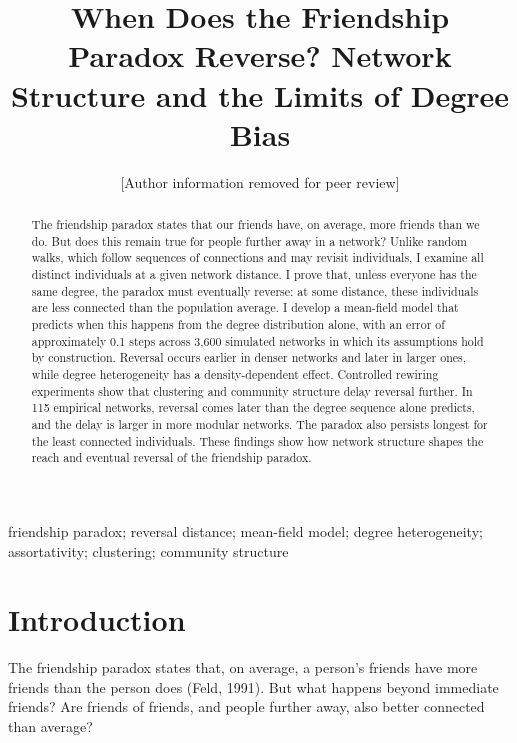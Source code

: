 \documentclass{nws}
\begin{document}


\title{When Does the Friendship Paradox Reverse? Network Structure and the Limits of Degree Bias}

\author{[Author information removed for peer review]}

\affil{}

\begin{abstract}
The friendship paradox states that our friends have, on average, more friends than we do. But does this remain true for people further away in a network? Unlike random walks, which follow sequences of connections and may revisit individuals, I examine all distinct individuals at a given network distance. I prove that, unless everyone has the same degree, the paradox must eventually reverse: at some distance, these individuals are less connected than the population average. I develop a mean-field model that predicts when this happens from the degree distribution alone, with an error of approximately 0.1 steps across 3{,}600 simulated networks in which its assumptions hold by construction. Reversal occurs earlier in denser networks and later in larger ones, while degree heterogeneity has a density-dependent effect. Controlled rewiring experiments show that clustering and community structure delay reversal further. In 115 empirical networks, reversal comes later than the degree sequence alone predicts, and the delay is larger in more modular networks. The paradox also persists longest for the least connected individuals. These findings show how network structure shapes the reach and eventual reversal of the friendship paradox.
\end{abstract}

\begin{keywords}
friendship paradox; reversal distance; mean-field model; degree heterogeneity; assortativity; clustering; community structure
\end{keywords}

\maketitle

\section{Introduction}

The friendship paradox states that, on average, a person's friends have more friends
than the person does (Feld, 1991). But what happens beyond immediate friends? Are
friends of friends, and people further away, also better connected than average?
\end{document}

